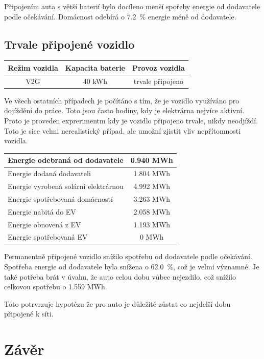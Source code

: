 \documentclass[12pt,a4paper]{Cotmas-2018}
\begin{document}
Připojením auta s větší baterií bylo docíleno menší spořeby energie od dodavatele podle očekávání.
Domácnost odebírá o 7.2~\% energie méně od dodavatele.

\subsection{Trvale připojené vozidlo}

\bigskip
\begin{tabular}{ | c | c | c | }
\hline
Režim vozidla & Kapacita baterie & Provoz vozidla \\
\hline
V2G & 40 kWh & trvale připojeno \\
\hline
\end{tabular}
\bigskip

Ve všech ostatních případech je počítáno s tím, že je vozidlo využíváno pro dojíždění do práce.
Toto jsou často hodiny, kdy je elektrárna nejvíce aktivní.
Proto je proveden exprerimentm kdy je vozidlo připojeno trvale, nikdy neodjíždí.
Toto je sice velmi nerealistický případ, ale umožní zjistit vliv nepřítomnosti vozidla.

\bigskip
\begin{tabular}{ | l | c | }
\hline
Energie odebraná od dodavatele & 0.940 MWh \\
\hline
Energie dodaná dodavateli & 1.804 MWh \\
\hline
Energie vyrobená solární elektrárnou & 4.992 MWh \\
\hline
Energie spotřebovaná domácností & 3.263 MWh \\
\hline
Energie nabitá do EV & 2.058 MWh \\
\hline
Energie obnovená z EV & 1.193 MWh \\
\hline
Energie spotřebovaná EV & 0 MWh \\
\hline
\end{tabular}
\bigskip

Permanentně připojené vozidlo snížilo spotřebu od dodavatele podle očekávání.
Spotřeba energie od dodavatele byla snížena o 62.0~\%, což je velmi významné.
Je také potřeba brát v úvahu, že auto celou dobu vůbec nejezdilo, což snížilo celkovou spotřebu o 1.559 MWh.

Toto potrvrzuje hypotézu že pro auto je důležité zůstat co nejdelší dobu připojené k síti.

\newpage

\section{Závěr}
\end{document}
